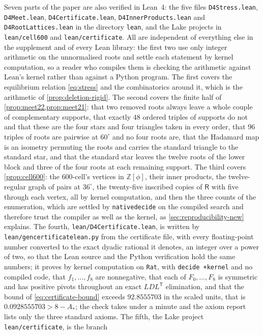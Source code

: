 \documentclass[11pt,reqno]{amsart}
\renewcommand{\_}{\origunderscore\allowbreak}
\numberwithin{equation}{section}
\theoremstyle{plain}
\theoremstyle{definition}
\theoremstyle{remark}
\newcommand{\Rt}{\mathsf{R}}                 %
\begin{document}
Seven parts of the paper are also verified in Lean~4: the five files
\texttt{D4Stress.lean}, \texttt{D4Meet.lean}, \texttt{D4Certificate.lean},
\texttt{D4InnerProducts.lean} and \texttt{D4RootLattices.lean} in the
directory \texttt{lean}, and the Lake projects in \texttt{lean/cell600}
and \texttt{lean/certificate}.
All are independent of everything else
in the supplement and of every Lean library: the first two use only
integer arithmetic on the unnormalised roots and settle each statement
by kernel computation, so a reader who compiles them is checking the
arithmetic against Lean's kernel rather than against a Python program. The first covers the equilibrium relation
\eqref{eq:stress} and the combinatorics around it, which is the
arithmetic of \cref{prop:deletion-rigid}. The second covers the finite
half of \cref{prop:meet22,prop:meet21}: that two removed roots always
leave a whole couple of complementary supports, that exactly $48$
ordered triples of supports do not and that these are the four stars and
four triangles taken in every order, that $96$ triples of roots are
pairwise at $60^\circ$ and no four roots are, that the Hadamard map is
an isometry permuting
the roots and carries the standard triangle to the standard star, and
that the standard star leaves the twelve roots of the lower block and
three of the four roots at each remaining support. The third covers
\cref{prop:cell600}: the $600$-cell's vertices in $\mathbb{Z}[\phi]$,
their inner products, the twelve-regular graph of pairs at $36^\circ$,
the twenty-five inscribed copies of $\Rt$ with five through each
vertex, all by kernel computation, and then the three counts of the
enumeration, which are settled by \texttt{native\_decide} on the
compiled search and therefore trust the compiler as well as the kernel,
as \cref{sec:reproducibility-new} explains. The fourth,
\texttt{lean/D4Certificate.lean}, is written by
\texttt{lean/gen\_certificate\_lean.py} from the certificate file, with
every floating-point number converted to the exact dyadic rational it
denotes, an integer over a power of two, so that the Lean source and
the Python verification hold the same numbers; it proves by kernel
computation on \texttt{Rat}, with \texttt{decide +kernel} and no
compiled code, that $f_1,\dots,f_8$ are nonnegative, that each of
$F_0,\dots,F_8$ is symmetric and has positive pivots throughout an exact
$LDL^{\mathsf T}$ elimination, and that the bound of
\eqref{eq:certificate-bound} exceeds $92.8555703$ in the scaled units,
that is $0.0928555703>8-A_*$; the check takes under a minute and the
axiom report lists only the three standard axioms. The fifth, the Lake project \texttt{lean/certificate}, is the branch
\end{document}
